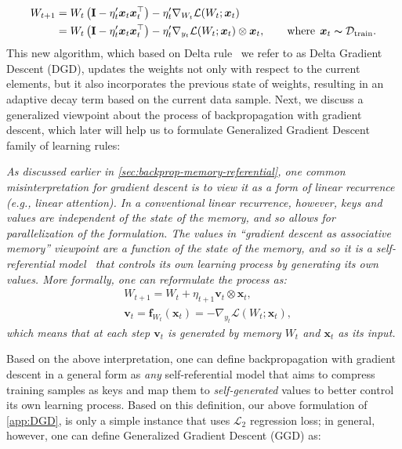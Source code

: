 \documentclass{article}
\newcommand{\vv}{\mathbf{v}}
\newcommand{\citep}{\parencite}
\renewcommand{\vv}{\boldsymbol{v}}
\newcommand{\vx}{\boldsymbol{x}}
\begin{document}
{\begin{align} \nonumber
    W_{t+1} &= W_{t} \left( \mathbf{I} -\eta'_t\boldsymbol{x}_t\boldsymbol{x}_t^{\top}\right) - \eta_{t}' \nabla_{W_t} \mathcal{L}(W_t;\boldsymbol{x}_t) \\ \label{eq:DGD}
    &= W_{t} \left( \mathbf{I} -\eta'_t\boldsymbol{x}_t \boldsymbol{x}_t^{\top}\right) - \eta_{t}' \nabla_{y_t} \mathcal{L}(W_t; \boldsymbol{x}_t) \otimes \boldsymbol{x}_t, \qquad \text{where}\:\: \boldsymbol{x}_t \thicksim \mathcal{D}_{\text{train}}.
\end{align}
This new algorithm, which based on Delta rule~\citep{prados1989neural} we refer to as Delta Gradient Descent (DGD), updates the weights not only with respect to the current elements, but it also incorporates the previous state of weights, resulting in an adaptive decay term based on the current data sample. Next, we discuss a generalized viewpoint about the process of backpropagation with gradient descent, which later will help us to formulate Generalized Gradient Descent family of learning rules:

\vspace{8pt}
 \begin{myboxi}
     \textit{As discussed earlier in \autoref{sec:backprop-memory-referential}, one common misinterpretation for gradient descent is to view it as a form of linear recurrence (e.g., linear attention). In a conventional linear recurrence, however, keys and values are independent of the state of the memory, and so allows for parallelization of the formulation. The values in ``gradient descent as associative memory'' viewpoint are a function of the state of the memory, and so it is a self-referential model~\citep{schmidhuber1993self} that controls its own learning process by generating its own values. More formally, one can reformulate the process as: }
\begin{align}
    &W_{t+1} =  W_{t} + \eta_{t+1} \vv_t \otimes \boldsymbol{x}_t,\\ \nonumber
    &\vv_t = \boldsymbol{f}_{W_t}\left(\vx_t \right) = - \nabla_{y_t} \mathcal{L}(W_t;\boldsymbol{x}_t),
\end{align}
\textit{which means that at each step $\vv_t$ is generated by memory $W_t$ and $\vx_t$ as its input.}
 \end{myboxi}

Based on the above interpretation, one can define backpropagation with gradient descent in a general form as \emph{any} self-referential model that aims to compress training samples as keys and map them to \emph{self-generated} values to better control its own learning process. Based on this definition, our above formulation of \autoref{app:DGD}, is only a simple instance that uses $\mathcal{L}_2$ regression loss; in general, however, one can define Generalized Gradient Descent (GGD) as: 

}
\end{document}
